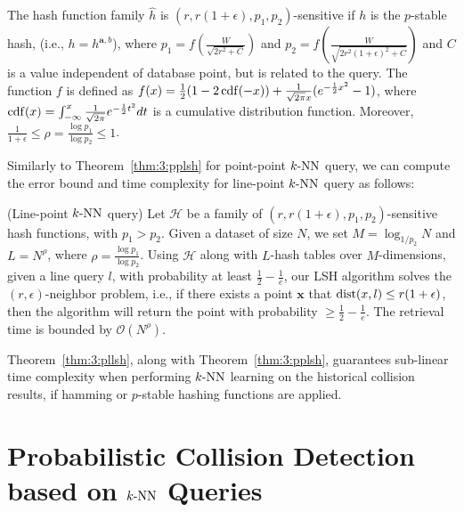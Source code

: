 \begin{theorem}
  \label{thm:3:pstablehash}
  The hash function family $\hat{h}$ is $(r, r(1+\epsilon), p_1, p_2)$-sensitive if $h$ is the $p$-stable hash, (i.e., $h = h^{\mathbf a, b}$), where $p_1 = f(\frac{W}{\sqrt{2r^2+C}})$ and $p_2 = f(\frac{W}{\sqrt{2r^2(1+\epsilon)^2+C}})$ and $C$ is a value independent of database point, but is related to the query. The function $f$ is defined as $f(x) = \frac{1}{2}(1 - 2 \operatorname{cdf}(-x)) + \frac{1}{\sqrt{2\pi} x} (e^{-\frac{1}{2}x^2} - 1)$, where $\operatorname{cdf}(x) = \int_{-\infty}^{x} \frac{1}{\sqrt{2\pi}}e^{-\frac{1}{2}t^2}dt$ is a cumulative distribution function. Moreover, $\frac{1}{1+\epsilon} \leq \rho = \frac{\log p_1}{\log p_2} \leq 1$.
\end{theorem}


Similarly to Theorem~\ref{thm:3:pplsh} for point-point $k\text{-NN}$ query, we can compute the error bound and time complexity for line-point $k\text{-NN}$ query as follows:
\begin{theorem}
  \label{thm:3:pllsh}
  (Line-point $k\text{-NN}$ query) Let $\mathcal H$ be a family of $(r, r(1+\epsilon), p_1, p_2)$-sensitive hash functions, with $p_1 > p_2$. Given a dataset of size $N$, we set $M = \log_{1/p_2} N$ and $L = N^{\rho}$, where $\rho = \frac{\log p_1}{\log p_2}$. Using $\mathcal H$ along with $L$-hash tables over $M$-dimensions, given a line query $l$, with probability at least $\frac{1}{2} - \frac{1}{e}$, our LSH algorithm solves the $(r, \epsilon)$-neighbor problem, i.e., if there exists a point $\mathbf x$ that $\operatorname{dist}(x, l) \leq r(1+\epsilon)$, then the algorithm will return the point with probability $\geq \frac{1}{2} - \frac{1}{e}$. The retrieval time is bounded by $\mathcal O(N^{\rho})$.
\end{theorem}


Theorem~\ref{thm:3:pllsh}, along with Theorem~\ref{thm:3:pplsh}, guarantees sub-linear time complexity when performing $k\text{-NN}$ learning on the historical collision results, if hamming or $p$-stable hashing functions are applied.


\section{Probabilistic Collision Detection based on $k\text{-NN}$ Queries}
\label{sec:3:knnreasoning}


